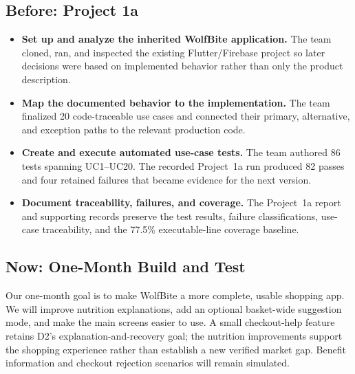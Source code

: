 \documentclass[sigconf]{acmart}
\begin{document}
\subsection{Before: Project 1a}

\begin{itemize}
  \item \textbf{Set up and analyze the inherited WolfBite application.}
  The team cloned, ran, and inspected the existing Flutter/Firebase project so
  later decisions were based on implemented behavior rather than only the
  product description.

  \item \textbf{Map the documented behavior to the implementation.}
  The team finalized 20 code-traceable use cases and connected their primary,
  alternative, and exception paths to the relevant production code.

  \item \textbf{Create and execute automated use-case tests.}
  The team authored 86 tests spanning UC1--UC20. The recorded Project~1a run
  produced 82 passes and four retained failures that became evidence for the
  next version.

  \item \textbf{Document traceability, failures, and coverage.}
  The Project~1a report and supporting records preserve the test results,
  failure classifications, use-case traceability, and the 77.5\%
  executable-line coverage baseline.
\end{itemize}

\subsection{Now: One-Month Build and Test}

Our one-month goal is to make WolfBite a more complete, usable shopping app.
We will improve nutrition explanations, add an optional basket-wide suggestion
mode, and make the main screens easier to use. A small checkout-help feature
retains D2's explanation-and-recovery goal; the nutrition improvements support
the shopping experience rather than establish a new verified market gap.
Benefit information and checkout rejection scenarios will remain simulated.
\end{document}
